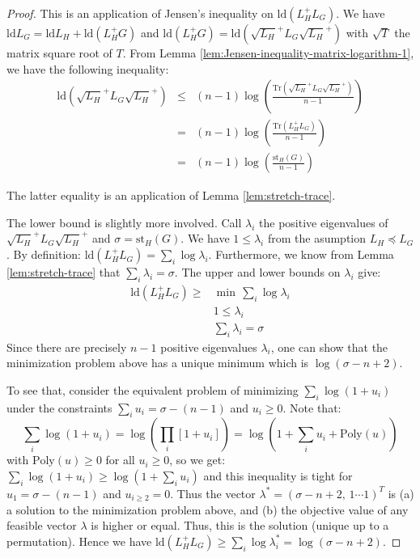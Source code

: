 \begin{proof} This is an application of Jensen's inequality on $\text{ld}\left(L_{H}^{+}L_{G}\right)$.
We have $\text{ld}L_{G}=\text{ld}L_{H}+\text{ld}\left(L_{H}^{+}G\right)$
and $\text{ld}\left(L_{H}^{+}G\right)=\text{ld}\left(\sqrt{L_{H}}^{+}L_{G}\sqrt{L_{H}}^{+}\right)$
with $\sqrt{T}$ the matrix square root of $T$. From Lemma \ref{lem:Jensen-inequality-matrix-logarithm-1},
we have the following inequality: 
\begin{eqnarray*}
\text{ld}\left(\sqrt{L_{H}}^{+}L_{G}\sqrt{L_{H}}^{+}\right) & \leq & \left(n-1\right)\log\left(\frac{\text{Tr}\left(\sqrt{L_{H}}^{+}L_{G}\sqrt{L_{H}}^{+}\right)}{n-1}\right)\\
 & = & \left(n-1\right)\log\left(\frac{\text{Tr}\left(L_{H}^{+}L_{G}\right)}{n-1}\right)\\
 & = & \left(n-1\right)\log\left(\frac{\text{st}_{H}\left(G\right)}{n-1}\right)
\end{eqnarray*}


The latter equality is an application of Lemma \ref{lem:stretch-trace}. 

The lower bound is slightly more involved. Call $\lambda_{i}$ the
positive eigenvalues of $\sqrt{L_{H}}^{+}L_{G}\sqrt{L_{H}}^{+}$ and
$\sigma=\text{st}_{H}\left(G\right)$. We have $1\leq\lambda_{i}$
from the asumption $L_{H}\preceq L_{G}$. By definition: $\text{ld}\left(L_{H}^{+}L_{G}\right)=\sum_{i}\log\lambda_{i}$.
Furthermore, we know from Lemma \ref{lem:stretch-trace} that $\sum_{i}\lambda_{i}=\sigma$.
The upper and lower bounds on $\lambda_{i}$ give:
\[
\begin{array}{cc}
\text{ld}\left(L_{H}^{+}L_{G}\right)\geq & \min\,\sum_{i}\log\lambda_{i}\\
 & 1\leq\lambda_{i}\\
 & \sum_{i}\lambda_{i}=\sigma
\end{array}
\]
Since there are precisely $n-1$ positive eigenvalues $\lambda_{i}$,
one can show that the minimization problem above has a unique minimum
which is $\log\left(\sigma-n+2\right)$.

To see that, consider the equivalent problem of minimizing $\sum_{i}\log\left(1+u_{i}\right)$
under the constraints $\sum_{i}u_{i}=\sigma-\left(n-1\right)$ and
$u_{i}\geq0$. Note that:
\[
\sum_{i}\log\left(1+u_{i}\right)=\log\left(\prod_{i}\left[1+u_{i}\right]\right)=\log\left(1+\sum_{i}u_{i}+\text{Poly}\left(u\right)\right)
\]
with $\text{Poly}\left(u\right)\geq0$ for all $u_{i}\geq0$, so we
get: $\sum_{i}\log\left(1+u_{i}\right)\geq\log\left(1+\sum_{i}u_{i}\right)$
and this inequality is tight for $u_{1}=\sigma-\left(n-1\right)$
and $u_{i\geq2}=0$. Thus the vector $\lambda^{*}=\left(\sigma-n+2,\,1\cdots1\right)^{T}$
is (a) a solution to the minimization problem above, and (b) the objective
value of any feasible vector $\lambda$ is higher or equal. Thus,
this is the solution (unique up to a permutation). Hence we have $\text{ld}\left(L_{H}^{+}L_{G}\right)\geq\sum_{i}\log\lambda_{i}^{*}=\log\left(\sigma-n+2\right)$.\end{proof}


